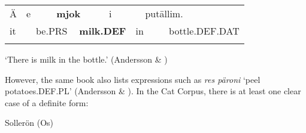 \begin{tabular}{llllllllll}
\lsptoprule
Ä & \multicolumn{2}{l}{e

} & \multicolumn{2}{l}{{\bfseries mjok}

} & \multicolumn{2}{l}{i

} & \multicolumn{2}{l}{putällim.

} & \\
\multicolumn{2}{l}{it

} & \multicolumn{2}{l}{be.PRS

} & \multicolumn{2}{l}{{\bfseries milk.DEF}

} & \multicolumn{2}{l}{in

} & \multicolumn{2}{l}{bottle.DEF.DAT

}\\
\lspbottomrule
\end{tabular}

\begin{styleTranslation}
‘There is milk in the bottle.’ (Andersson \& \citet[373]{Danielsson1999})

\end{styleTranslation}

\begin{styleBodyTextFirst}
However, the same book also lists expressions such as \textit{res päroni} ‘peel potatoes.DEF.PL’ (Andersson \& \citet[176]{Danielsson1999}). In the Cat Corpus, there is at least one clear case of a definite form:

\end{styleBodyTextFirst}


\begin{listWWNumileveli}
\item {}

\begin{styleExample}
Sollerön (Os) 

\end{styleExample}

\end{listWWNumileveli}

